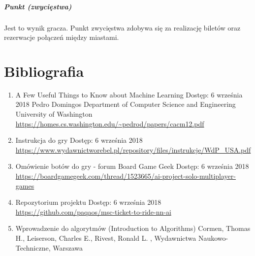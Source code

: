 \documentclass[12pt, oneside]{report}
\begin{document}
\paragraph{Punkt (zwycięstwa)} Jest to wynik gracza. Punkt zwycięstwa zdobywa się za realizację biletów oraz rezerwacje połączeń między miastami.
\chapter{Bibliografia}
\begin{enumerate}
	\item{A Few Useful Things to Know about Machine Learning
	}
	\subitem Dostęp: 6 września 2018
	\subitem Pedro Domingos
	\subitem Department of Computer Science and Engineering
	\subitem University of Washington
	\subitem \url{https://homes.cs.washington.edu/~pedrod/papers/cacm12.pdf}

	\item{Instrukcja do gry}
	\subitem Dostęp: 6 września 2018
	\subitem \url{https://www.wydawnictworebel.pl/repository/files/instrukcje/WdP_USA.pdf}
	
	\item{Omówienie botów do gry - forum Board Game Geek}
	\subitem Dostęp: 6 września 2018
	\subitem \url{https://boardgamegeek.com/thread/1523665/ai-project-solo-multiplayer-games}
	\item{Repozytorium projektu}
	\subitem Dostęp: 6 września 2018
	\subitem \url{https://github.com/paqaos/msc-ticket-to-ride-nn-ai}
	\item{Wprowadzenie do algorytmów (Introduction to Algorithms)}
	\subitem Cormen, Thomas H., Leiserson, Charles E., Rivest, Ronald L.
	, Wydawnictwa Naukowo-Techniczne, Warszawa
\end{enumerate}
\listoffigures
\listoftables
\end{document}
